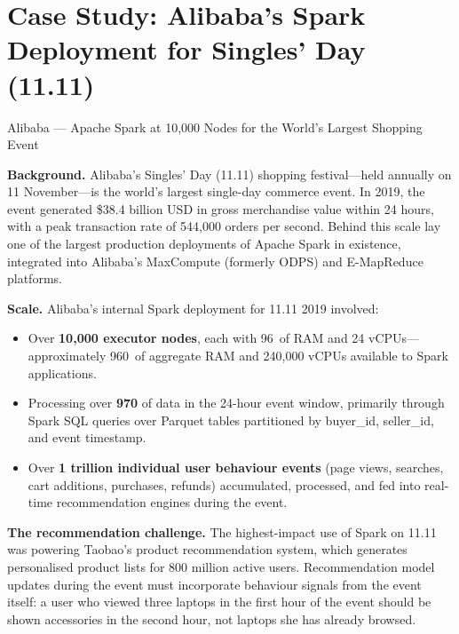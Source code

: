 \section{Case Study: Alibaba's Spark Deployment for Singles' Day (11.11)}
\label{sec:alibaba-case}

\begin{casestudy}{Alibaba --- Apache Spark at 10{,}000 Nodes for the World's Largest Shopping Event}

\textbf{Background.}
Alibaba's Singles' Day (11.11) shopping festival---held annually on
11 November---is the world's largest single-day commerce event.
In 2019, the event generated \$38.4 billion USD in gross merchandise
value within 24 hours, with a peak transaction rate of 544{,}000
orders per second. Behind this scale lay one of the largest production
deployments of Apache Spark in existence, integrated into Alibaba's
MaxCompute (formerly ODPS) and E-MapReduce platforms.

\smallskip
\textbf{Scale.}
Alibaba's internal Spark deployment for 11.11 2019 involved:
\begin{itemize}
  \item Over \textbf{10{,}000 executor nodes}, each with 96\GB\ of RAM
        and 24 vCPUs---approximately 960\TB\ of aggregate RAM and
        240{,}000 vCPUs available to Spark applications.
  \item Processing over \textbf{970\PB} of data in the 24-hour event
        window, primarily through Spark SQL queries over Parquet tables
        partitioned by buyer\_id, seller\_id, and event timestamp.
  \item Over \textbf{1 trillion individual user behaviour events}
        (page views, searches, cart additions, purchases, refunds)
        accumulated, processed, and fed into real-time recommendation
        engines during the event.
\end{itemize}

\smallskip
\textbf{The recommendation challenge.}
The highest-impact use of Spark on 11.11 was powering Taobao's
product recommendation system, which generates personalised product
lists for 800 million active users. Recommendation model updates during
the event must incorporate behaviour signals from the event itself:
a user who viewed three laptops in the first hour of the event should
be shown accessories in the second hour, not laptops she has already
browsed.


\end{casestudy}
